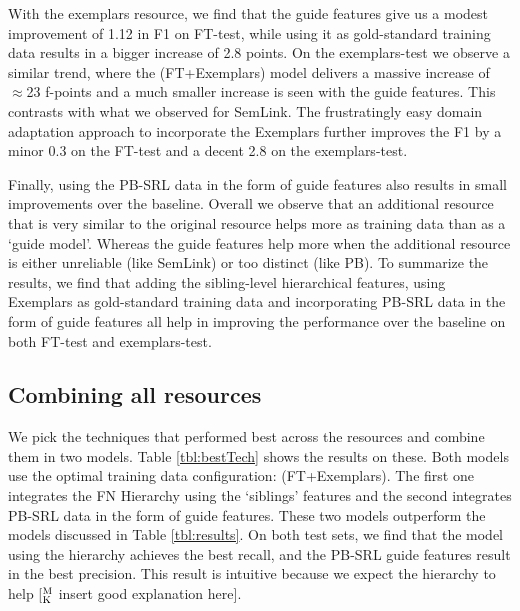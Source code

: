 \documentclass[11pt,a4paper]{article}
\newcommand{\ensuretext}[1]{#1}
\newcommand{\mkmarker}{\ensuretext{\textcolor{mdgreen}{\ensuremath{^{\textsc{M}}_{\textsc{K}}}}}}
\newcommand{\arkcomment}[3]{\ensuretext{\textcolor{#3}{[#1 #2]}}}
\newcommand{\mk}[1]{\arkcomment{\mkmarker}{#1}{mdgreen}}
\begin{document}
With the exemplars resource, we find that the guide features give us a modest improvement of 1.12 in F1 on FT-test, 
while using it as gold-standard training data results in a bigger increase of 2.8 points. 
On the exemplars-test we observe a similar trend, where the (FT+Exemplars) model delivers a massive increase of $\approx$23 f-points and a 
much smaller increase is seen with the guide features. This contrasts with what we observed for SemLink.
The frustratingly easy domain adaptation approach to incorporate the Exemplars
further improves the F1 by a minor 0.3 on the FT-test and a decent 2.8 on the exemplars-test.

Finally, using the PB-SRL data in the form of guide features also results in small improvements over the baseline. 
Overall we observe that an additional resource that is very similar to the original resource helps more as training data than as a `guide model'.
Whereas the guide features help more when the additional resource is either unreliable (like SemLink) or too distinct (like PB). 
To summarize the results, we find that adding the sibling-level hierarchical features, using Exemplars as gold-standard training data and 
incorporating PB-SRL data in the form of guide features all help in improving the performance over the baseline on both FT-test and exemplars-test.
 
\subsection{Combining all resources}

We pick the techniques that performed best across the resources and combine them in two models. Table \ref{tbl:bestTech} shows the results on these.
Both models use the optimal training data configuration: (FT+Exemplars). The first one integrates the FN Hierarchy using the `siblings' features
and the second integrates PB-SRL data in the form of guide features. These two models outperform the models discussed in Table \ref{tbl:results}.
On both test sets, we find that the model using the hierarchy achieves the best recall, and the PB-SRL guide features result in the 
best precision. This result is intuitive because we expect the hierarchy to help \mk{insert good explanation here}.
\end{document}
